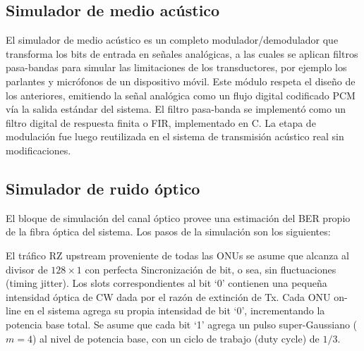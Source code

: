 \subsection{Simulador de medio acústico}
El simulador de medio acústico es un completo modulador/demodulador que transforma los bits de entrada en señales analógicas, a las cuales se aplican filtros pasa-bandas para simular las limitaciones de los transductores, por ejemplo los parlantes y micrófonos de un dispositivo móvil. Este módulo respeta el diseño de los anteriores, emitiendo la señal analógica como un flujo digital codificado PCM vía la salida estándar del sistema. El filtro pasa-banda se implementó como un filtro digital de respuesta finita o FIR, implementado en C.
La etapa de modulación fue luego reutilizada en el sistema de transmisión acústico real sin modificaciones.

\subsection{Simulador de ruido óptico}

El bloque de simulación del canal óptico provee una estimación del BER propio de la fibra óptica del sistema. Los pasos de la simulación son los siguientes:

El tráfico RZ upstream proveniente de todas las ONUs se asume que alcanza al divisor de $128\times1$ con perfecta Sincronización de bit, o sea, sin fluctuaciones (timing jitter).
Los slots correspondientes al bit `0' contienen una pequeña intensidad óptica de CW dada por el razón de extinción de Tx.
Cada ONU on-line en el sistema agrega su propia intensidad de bit `0', incrementando la potencia base total.
Se asume que cada bit `1' agrega un pulso super-Gaussiano ($m=4$) al nivel de potencia base, con un ciclo de trabajo (duty cycle) de $1/3$.


